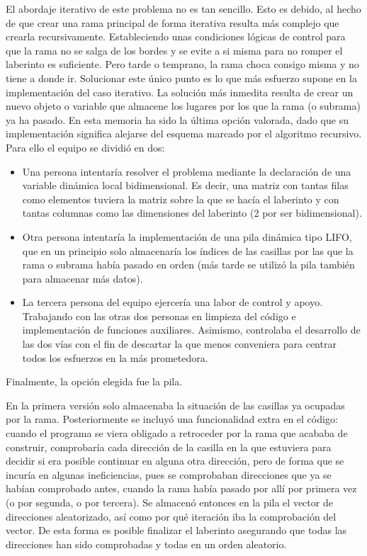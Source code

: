 \documentclass[12pt,a4paper]{article}
\begin{document}
El abordaje iterativo de este problema no es tan sencillo. Esto es debido, al hecho de que crear una rama principal de forma iterativa resulta más complejo que crearla recursivamente. Estableciendo unas condiciones lógicas de control para que la rama no se salga de los bordes y se evite a si misma para no romper el laberinto es suficiente. Pero tarde o temprano, la rama choca consigo misma y no tiene a donde ir. Solucionar este único punto es lo que más esfuerzo supone en la implementación del caso iterativo. La solución más inmedita resulta de crear un nuevo objeto o variable que almacene los lugares por los que la rama (o subrama) ya ha pasado. En esta memoria ha sido la última opción valorada, dado que su implementación significa alejarse del esquema marcado por el algoritmo recursivo. Para ello el equipo se dividió en dos: 
\begin{itemize}
	\item Una persona intentaría resolver el problema mediante la declaración de una variable dinámica local bidimensional. Es decir, una matriz con tantas filas como elementos tuviera la matriz sobre la que se hacía el laberinto y con tantas columnas como las dimensiones del laberinto (2 por ser bidimensional). 
	\item Otra persona intentaría la implementación de una pila dinámica tipo LIFO, que en un principio solo almacenaría los índices de las casillas por las que la rama o subrama había pasado en orden (más tarde se utilizó la pila también para almacenar más datos). 
	\item La tercera persona del equipo ejercería una labor de control y apoyo. Trabajando con las otras dos personas en limpieza del código e implementación de funciones auxiliares. Asimismo, controlaba el desarrollo de las dos vías con el fin de descartar la que menos conveniera para centrar todos los esfuerzos en la más prometedora.
\end{itemize}

Finalmente, la opción elegida fue la pila.  

En la primera versión solo almacenaba la situación de las casillas ya ocupadas por la rama. Posteriormente se incluyó una funcionalidad extra en el código: cuando el programa se viera obligado a retroceder por la rama que acababa de construir, comprobaría cada dirección de la casilla en la que estuviera para decidir si era posible continuar en alguna otra dirección, pero de forma que se incuría en algunas ineficiencias, pues se comprobaban direcciones que ya se habían comprobado antes, cuando la rama había pasado por allí por primera vez (o por segunda, o por tercera). Se almacenó entonces en la pila el vector de direcciones aleatorizado, así como por qué iteración iba la comprobación del vector. De esta forma es posible finalizar el laberinto asegurando que todas las direcciones han sido comprobadas y todas en un orden aleatorio.
\end{document}
